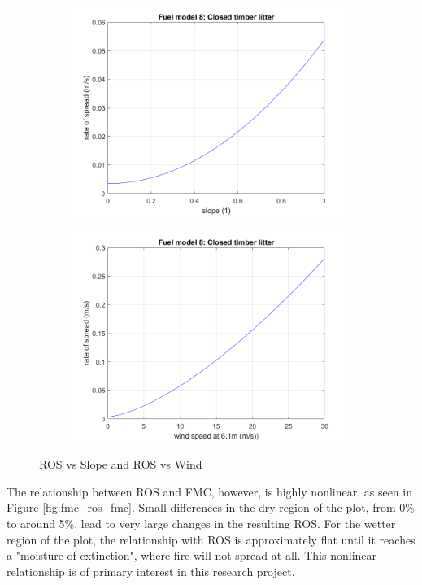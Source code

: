 \documentclass[11pt]{article}%
\begin{document}
\begin{figure}[ht]
    \centering
    \begin{subfigure}{0.45\textwidth}
        \centering
        \includegraphics[width=\linewidth]{images/fuel8_ros_slope.png}
    \end{subfigure}
    \hfill
    \begin{subfigure}{0.45\textwidth}
        \centering
        \includegraphics[width=\linewidth]{images/fuel8_ros_wind.png}
    \end{subfigure}
    \caption{ROS vs Slope and ROS vs Wind}
    \label{fig:ros_other}
\end{figure}


The relationship between ROS and FMC, however, is highly nonlinear, as seen in Figure \ref{fig:fmc_ros_fmc}. Small differences in the dry region of the plot, from 0\% to around 5\%, lead to very large changes in the resulting ROS. For the wetter region of the plot, the relationship with ROS is approximately flat until it reaches a "moisture of extinction", where fire will not spread at all. This nonlinear relationship is of primary interest in this research project. 
\end{document}
